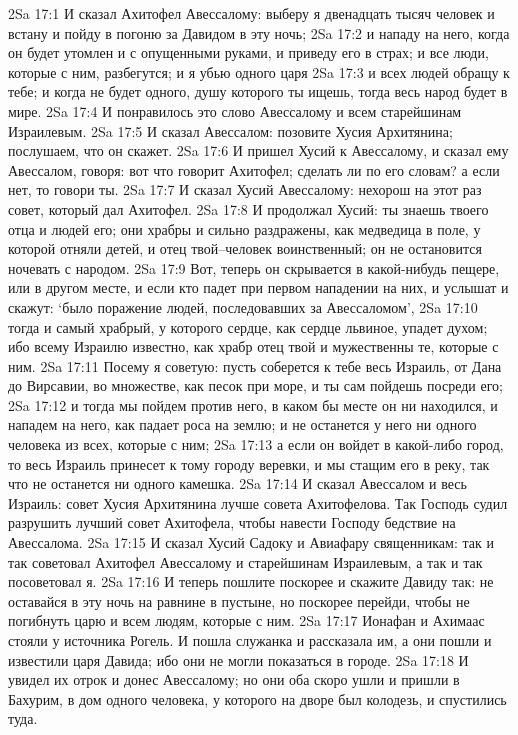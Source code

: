 2Sa 17:1  И сказал Ахитофел Авессалому: выберу я двенадцать тысяч человек и встану и пойду в погоню за Давидом в эту ночь;
2Sa 17:2  и нападу на него, когда он будет утомлен и с опущенными руками, и приведу его в страх; и все люди, которые с ним, разбегутся; и я убью одного царя
2Sa 17:3  и всех людей обращу к тебе; и когда не будет одного, душу которого ты ищешь, тогда весь народ будет в мире.
2Sa 17:4  И понравилось это слово Авессалому и всем старейшинам Израилевым.
2Sa 17:5  И сказал Авессалом: позовите Хусия Архитянина; послушаем, что он скажет.
2Sa 17:6  И пришел Хусий к Авессалому, и сказал ему Авессалом, говоря: вот что говорит Ахитофел; сделать ли по его словам? а если нет, то говори ты.
2Sa 17:7  И сказал Хусий Авессалому: нехорош на этот раз совет, который дал Ахитофел.
2Sa 17:8  И продолжал Хусий: ты знаешь твоего отца и людей его; они храбры и сильно раздражены, как медведица в поле, у которой отняли детей, и отец твой--человек воинственный; он не остановится ночевать с народом.
2Sa 17:9  Вот, теперь он скрывается в какой-нибудь пещере, или в другом месте, и если кто падет при первом нападении на них, и услышат и скажут: `было поражение людей, последовавших за Авессаломом',
2Sa 17:10  тогда и самый храбрый, у которого сердце, как сердце львиное, упадет духом; ибо всему Израилю известно, как храбр отец твой и мужественны те, которые с ним.
2Sa 17:11  Посему я советую: пусть соберется к тебе весь Израиль, от Дана до Вирсавии, во множестве, как песок при море, и ты сам пойдешь посреди его;
2Sa 17:12  и тогда мы пойдем против него, в каком бы месте он ни находился, и нападем на него, как падает роса на землю; и не останется у него ни одного человека из всех, которые с ним;
2Sa 17:13  а если он войдет в какой-либо город, то весь Израиль принесет к тому городу веревки, и мы стащим его в реку, так что не останется ни одного камешка.
2Sa 17:14  И сказал Авессалом и весь Израиль: совет Хусия Архитянина лучше совета Ахитофелова. Так Господь судил разрушить лучший совет Ахитофела, чтобы навести Господу бедствие на Авессалома.
2Sa 17:15  И сказал Хусий Садоку и Авиафару священникам: так и так советовал Ахитофел Авессалому и старейшинам Израилевым, а так и так посоветовал я.
2Sa 17:16  И теперь пошлите поскорее и скажите Давиду так: не оставайся в эту ночь на равнине в пустыне, но поскорее перейди, чтобы не погибнуть царю и всем людям, которые с ним.
2Sa 17:17  Ионафан и Ахимаас стояли у источника Рогель. И пошла служанка и рассказала им, а они пошли и известили царя Давида; ибо они не могли показаться в городе.
2Sa 17:18  И увидел их отрок и донес Авессалому; но они оба скоро ушли и пришли в Бахурим, в дом одного человека, у которого на дворе был колодезь, и спустились туда.
